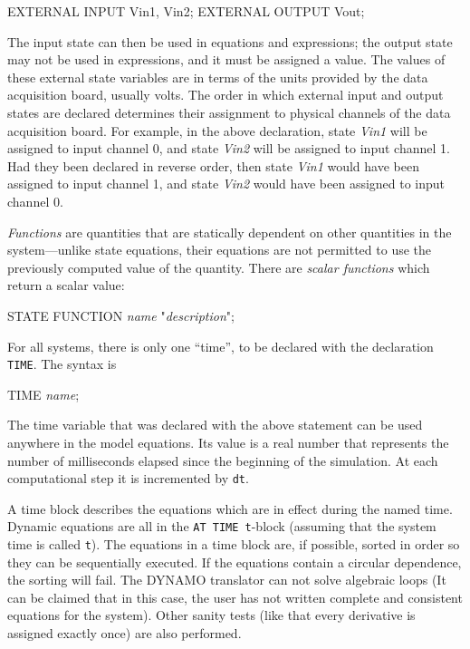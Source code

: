 \begin{example}
        EXTERNAL INPUT Vin1, Vin2;
        EXTERNAL OUTPUT Vout;
\end{example}

The input state can then be used in equations and expressions; the output state may not be used in expressions, and it must be assigned a value.  The values of these external state variables are in terms of
the units provided by the data acquisition board, usually volts. The order in which external input and output states are declared determines their assignment to physical channels of the data acquisition board.  For example, in the above declaration, state \emph{Vin1} will be assigned to input channel 0, and state \emph{Vin2} will be assigned to input channel 1. Had they been declared in reverse order, then state \emph{Vin1} would have been assigned to input channel 1, and state \emph{Vin2} would have been assigned to input channel 0.

\emph{Functions} are quantities that are statically dependent on other quantities in the system---unlike state equations, their equations are not permitted to use the previously computed value of the quantity. There are \emph{scalar functions} which return a scalar value:
\begin{example}
        STATE FUNCTION \emph{name} "\emph{description}";
\end{example}

For all systems, there is only one ``time'', to be declared with the declaration \texttt{TIME}. The syntax is

\begin{example}
        TIME \emph{name};
\end{example}

The time variable that was declared with the above statement can be used anywhere in the model equations. Its value is a real number that represents the number of milliseconds elapsed since the beginning of the simulation. At each computational step it is incremented by \texttt{dt}.

A time block describes the equations which are in effect during the named time. Dynamic equations are all in the \texttt{AT TIME t}-block (assuming that the system time is called \texttt{t}).  The equations in a time block are, if possible, sorted in order so they can be sequentially executed. If the equations contain a circular dependence, the sorting will fail. The DYNAMO translator can not solve algebraic loops (It can be claimed that in this case, the user has not written complete and consistent equations for the system). Other sanity tests (like that every derivative is assigned exactly once) are also performed.

